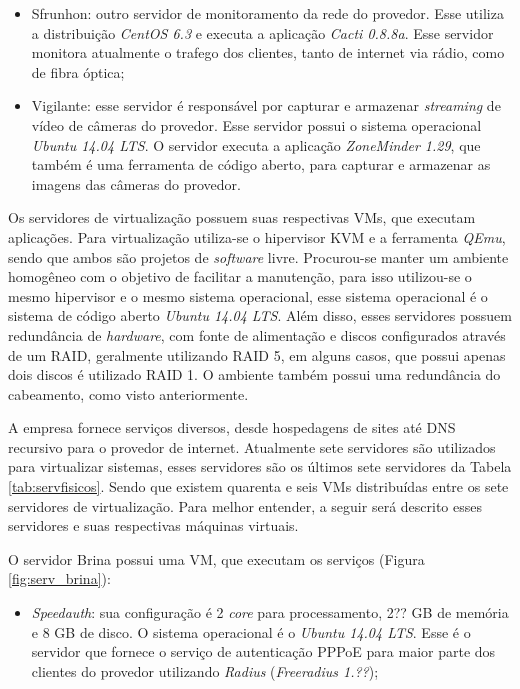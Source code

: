 \begin{itemize}
 \item Sfrunhon: outro servidor de monitoramento da rede do provedor. Esse utiliza a distribuição \textit{CentOS 6.3} e executa a aplicação
 \textit{Cacti 0.8.8a}. Esse servidor monitora atualmente o trafego dos clientes, tanto de internet via rádio, como de fibra óptica;
 
 \item Vigilante: esse servidor é responsável por capturar e armazenar \textit{streaming} de vídeo de câmeras do provedor. Esse servidor possui
 o sistema operacional \textit{Ubuntu 14.04 \ac{LTS}}. O servidor executa a aplicação \textit{ZoneMinder 1.29}, que também é uma ferramenta de 
 código aberto, para capturar e armazenar as imagens das câmeras do provedor.
\end{itemize}


Os servidores de virtualização possuem suas respectivas \ac{VM}s, que executam aplicações. Para virtualização utiliza-se o hipervisor 
\ac{KVM} e a ferramenta \textit{QEmu}, sendo que ambos são projetos de \textit{software} livre. Procurou-se manter um ambiente homogêneo 
com o objetivo de facilitar a manutenção, para isso utilizou-se o mesmo hipervisor e o mesmo sistema operacional, esse sistema operacional é
o sistema de código aberto \textit{Ubuntu 14.04 \ac{LTS}}.
Além disso, esses servidores possuem redundância de \textit{hardware}, com fonte de alimentação e discos configurados através de um \ac{RAID}, 
geralmente utilizando \ac{RAID} 5, em alguns casos, que possui apenas dois discos é utilizado \ac{RAID} 1. O ambiente também possui uma 
redundância do cabeamento, como visto anteriormente.

A empresa fornece serviços diversos, desde hospedagens de sites até \ac{DNS} recursivo para o provedor de internet. Atualmente sete servidores 
são utilizados para virtualizar sistemas, esses servidores são os últimos sete servidores da Tabela \ref{tab:servfisicos}.
Sendo que existem quarenta e seis \ac{VM}s distribuídas entre os sete servidores de virtualização.
Para melhor entender, a seguir será descrito esses servidores e suas respectivas máquinas virtuais.

O servidor Brina possui uma \ac{VM}, que executam os serviços (Figura \ref{fig:serv_brina}):
\begin{itemize}
 \item \textit{Speedauth}: sua configuração é 2 \textit{core} para processamento, 2?? GB de memória e 8 GB de disco. O sistema operacional é o 
 \textit{Ubuntu 14.04 \ac{LTS}}. Esse é o servidor que fornece o serviço de autenticação \ac{PPPoE} para maior parte dos clientes do provedor 
 utilizando \textit{Radius} (\textit{Freeradius 1.??});
\end{itemize}


